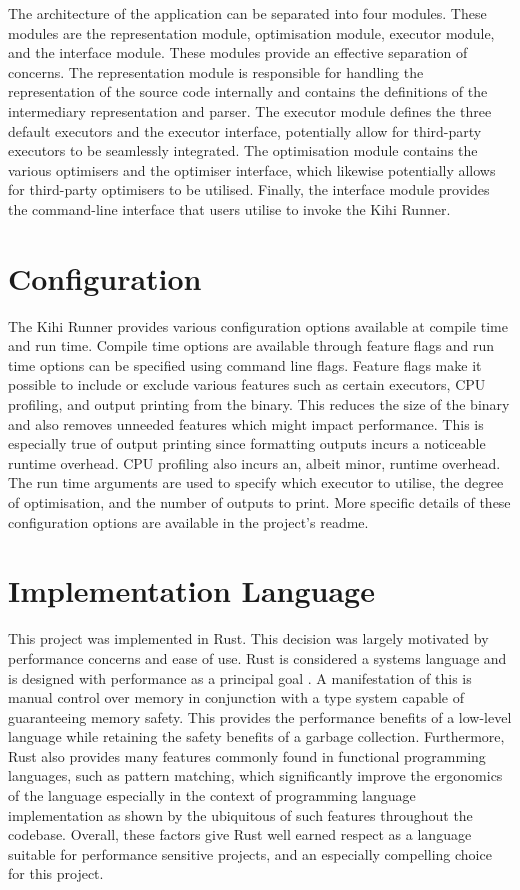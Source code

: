 The architecture of the application can be separated into four modules. These modules are the representation module, optimisation module, executor module, and the interface module. These modules provide an effective separation of concerns. The representation module is responsible for handling the representation of the source code internally and contains the definitions of the intermediary representation and parser. The executor module defines the three default executors and the executor interface, potentially allow for third-party executors to be seamlessly integrated. The optimisation module contains the various optimisers and the optimiser interface, which likewise potentially allows for third-party optimisers to be utilised. Finally, the interface module provides the command-line interface that users utilise to invoke the Kihi Runner.

\section{Configuration}
The Kihi Runner provides various configuration options available at compile time and run time. Compile time options are available through feature flags and run time options can be specified using command line flags. Feature flags make it possible to include or exclude various features such as certain executors, CPU profiling, and output printing from the binary. This reduces the size of the binary and also removes unneeded features which might impact performance. This is especially true of output printing since formatting outputs incurs a noticeable runtime overhead. CPU profiling also incurs an, albeit minor, runtime overhead. The run time arguments are used to specify which executor to utilise, the degree of optimisation, and the number of outputs to print. More specific details of these configuration options are available in the project's readme.

\section{Implementation Language}
This project was implemented in Rust. This decision was largely motivated by performance concerns and ease of use. Rust is considered a systems language and is designed with performance as a principal goal \cite{matsakis2014rust}. A manifestation of this is manual control over memory in conjunction with a type system capable of guaranteeing memory safety. This provides the performance benefits of a low-level language while retaining the safety benefits of a garbage collection. Furthermore, Rust also provides many features commonly found in functional programming languages, such as pattern matching, which significantly improve the ergonomics of the language especially in the context of programming language implementation as shown by the ubiquitous of such features throughout the codebase. Overall, these factors give Rust well earned respect as a language suitable for performance sensitive projects, and an especially compelling choice for this project.

